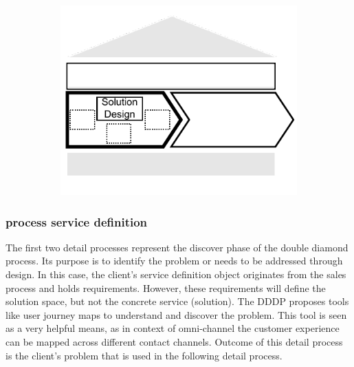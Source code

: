 	 \begin{figure}[caption={Solution Design process}, label={fig:soldes}]
	 	\begin{subfigure}[c]{.45\textwidth}
	 		\begin{center}
	 			\includegraphics{figures/processes/solutiondesign.pdf}
	 		\end{center}
	 	\end{subfigure}
	 	\begin{subfigure}[c]{.45\textwidth}
	 		\begin{center}
	 		\end{center}
	 	\end{subfigure}
	 	
	 \end{figure}
 
 	\subsubsection{process service definition}
 	The first two detail processes represent the discover phase of the double diamond process. Its purpose is to identify the problem or needs to be addressed through design. In this case, the client's service definition object originates from the sales process and holds requirements. However, these requirements will define the solution space, but not the concrete service (solution). The \acrshort{DDDP} proposes tools like user journey maps to understand and discover the problem. This tool is seen as a very helpful means, as in context of omni-channel the customer experience can be mapped across different contact channels. Outcome of this detail process is the client's problem that is used in the following detail process. 
 	
